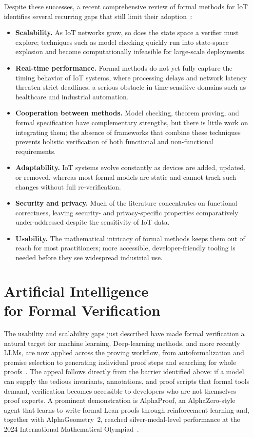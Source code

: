 \documentclass[conference]{IEEEtran}
\begin{document}
Despite these successes, a recent comprehensive review of formal methods for IoT identifies several recurring gaps that still limit their adoption~\cite{iotformalreview2024}:

\begin{itemize}
  \item \textbf{Scalability.} As IoT networks grow, so does the state space a verifier must explore; techniques such as model checking quickly run into state-space explosion and become computationally infeasible for large-scale deployments.
  \item \textbf{Real-time performance.} Formal methods do not yet fully capture the timing behavior of IoT systems, where processing delays and network latency threaten strict deadlines, a serious obstacle in time-sensitive domains such as healthcare and industrial automation.
  \item \textbf{Cooperation between methods.} Model checking, theorem proving, and formal specification have complementary strengths, but there is little work on integrating them; the absence of frameworks that combine these techniques prevents holistic verification of both functional and non-functional requirements.
  \item \textbf{Adaptability.} IoT systems evolve constantly as devices are added, updated, or removed, whereas most formal models are static and cannot track such changes without full re-verification.
  \item \textbf{Security and privacy.} Much of the literature concentrates on functional correctness, leaving security- and privacy-specific properties comparatively under-addressed despite the sensitivity of IoT data.
  \item \textbf{Usability.} The mathematical intricacy of formal methods keeps them out of reach for most practitioners; more accessible, developer-friendly tooling is needed before they see widespread industrial use.
\end{itemize}

\section{Artificial Intelligence\\ for Formal Verification}\label{sec:ai}

The usability and scalability gaps just described have made formal verification a natural target for machine learning. Deep-learning methods, and more recently LLMs, are now applied across the proving workflow, from autoformalization and premise selection to generating individual proof steps and searching for whole proofs~\cite{li2024dltp}. The appeal follows directly from the barrier identified above: if a model can supply the tedious invariants, annotations, and proof scripts that formal tools demand, verification becomes accessible to developers who are not themselves proof experts. A prominent demonstration is AlphaProof, an AlphaZero-style agent that learns to write formal Lean proofs through reinforcement learning and, together with AlphaGeometry~2, reached silver-medal-level performance at the 2024 International Mathematical Olympiad~\cite{hubert2025alphaproof}.
\end{document}
